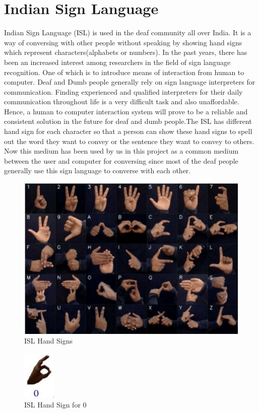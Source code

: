 \documentclass[12pt,a4paper]{report}
\begin{document}
\section{Indian Sign Language}
Indian Sign Language (ISL) is used in the deaf community all over India. It is a way of conversing with other people without speaking by showing hand signs which represent characters(alphabets or numbers). In the past years, there has been an increased interest among researchers in the field of sign language recognition. One of which is to introduce means of interaction from human to computer. Deaf and Dumb people generally rely on sign language interpreters for communication. Finding experienced and qualified interpreters for their daily communication throughout life is a very difficult task and also unaffordable. Hence, a human to computer interaction system will prove to be a reliable and consistent solution in the future for deaf and dumb people.The ISL has different hand sign for each character so that a person can show these hand signs to spell out the word they want to convey or the sentence they want to convey to others. Now this medium has been used by us in this project as a common medium between the user and computer for conversing since most of the deaf people generally use this sign language to converse with each other.
\begin{figure}[htbp]
	\centerline{\includegraphics[scale=1]{isl.png}}
	\caption{ISL Hand Signs}
	\label{Isl}
\end{figure}
\begin{figure}[htbp]
	\centerline{\includegraphics[scale=1]{isl_0.png}}
	\caption{ISL Hand Sign for 0}
	\label{Isl0}
\end{figure}
\end{document}
